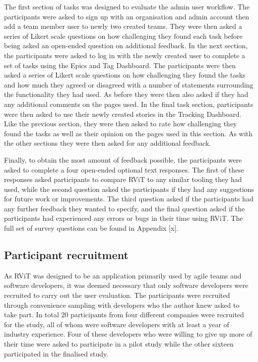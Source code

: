 \documentclass[l4proj.tex]{subfiles}
\begin{document}
The first section of tasks was designed to evaluate the admin user workflow. The participants were asked to sign up with an organisation and admin account then add a team member user to newly two created teams. They were then asked a series of Likert scale questions on how challenging they found each task before being asked an open-ended question on additional feedback. In the next section, the participants were asked to log in with the newly created user to complete a set of tasks using the Epics and Tag Dashboard. The participants were then asked a series of Likert scale questions on how challenging they found the tasks and how much they agreed or disagreed with a number of statements surrounding the functionality they had used. As before they were then also asked if they had any additional comments on the pages used. In the final task section, participants were then asked to use their newly created stories in the Tracking Dashboard. Like the previous section, they were then asked to rate how challenging they found the tasks as well as their opinion on the pages used in this section. As with the other sections they were then asked for any additional feedback.

Finally, to obtain the most amount of feedback possible, the participants were asked to complete a four open-ended optional text responses. The first of these responses asked participants to compare RViT to any similar tooling they had used, while the second question asked the participants if they had any suggestions for future work or improvements. The third question asked if the participants had any further feedback they wanted to specify, and the final question asked if the participants had experienced any errors or bugs in their time using RViT. The full set of survey questions can be found in Appendix [x].


\subsection{Participant recruitment}
As RViT was designed to be an application primarily used by agile teams and software developers, it was deemed necessary that only software developers were recruited to carry out the user evaluation. The participants were recruited through convenience sampling with developers who the author knew asked to take part. In total 20 participants from four different companies were recruited for the study, all of whom were software developers with at least a year of industry experience. Four of these developers who were willing to give up more of their time were asked to participate in a pilot study while the other sixteen participated in the finalised study.
\end{document}
